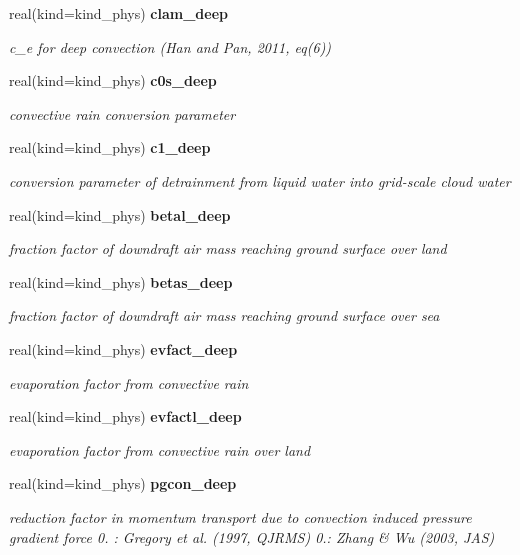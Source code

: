 \begin{DoxyCompactItemize}
real(kind=kind\+\_\+phys) \textbf{ clam\+\_\+deep}
\begin{DoxyCompactList}\small\item\em c\+\_\+e for deep convection (Han and Pan, 2011, eq(6)) \end{DoxyCompactList}\item 
real(kind=kind\+\_\+phys) \textbf{ c0s\+\_\+deep}
\begin{DoxyCompactList}\small\item\em convective rain conversion parameter \end{DoxyCompactList}\item 
real(kind=kind\+\_\+phys) \textbf{ c1\+\_\+deep}
\begin{DoxyCompactList}\small\item\em conversion parameter of detrainment from liquid water into grid-\/scale cloud water \end{DoxyCompactList}\item 
real(kind=kind\+\_\+phys) \textbf{ betal\+\_\+deep}
\begin{DoxyCompactList}\small\item\em fraction factor of downdraft air mass reaching ground surface over land \end{DoxyCompactList}\item 
real(kind=kind\+\_\+phys) \textbf{ betas\+\_\+deep}
\begin{DoxyCompactList}\small\item\em fraction factor of downdraft air mass reaching ground surface over sea \end{DoxyCompactList}\item 
real(kind=kind\+\_\+phys) \textbf{ evfact\+\_\+deep}
\begin{DoxyCompactList}\small\item\em evaporation factor from convective rain \end{DoxyCompactList}\item 
real(kind=kind\+\_\+phys) \textbf{ evfactl\+\_\+deep}
\begin{DoxyCompactList}\small\item\em evaporation factor from convective rain over land \end{DoxyCompactList}\item 
real(kind=kind\+\_\+phys) \textbf{ pgcon\+\_\+deep}
\begin{DoxyCompactList}\small\item\em reduction factor in momentum transport due to convection induced pressure gradient force 0. \+: Gregory et al. (1997, Q\+J\+R\+MS) 0.\+: Zhang \& Wu (2003, J\+AS) \end{DoxyCompactList}\item 

\end{DoxyCompactItemize}

